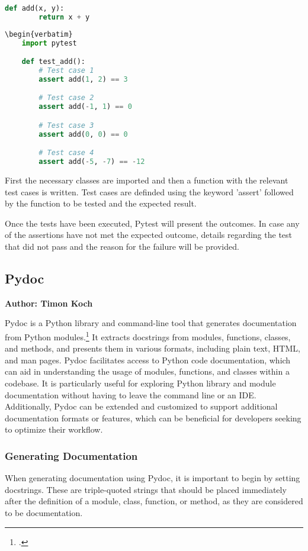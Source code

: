 \begin{minipage}
\begin{lstlisting}[language=Python] 
	def add(x, y):
    	return x + y
\end{lstlisting}

\begin{lstlisting}[language=Python]
\begin{verbatim} 
	import pytest

	def test_add():
    	# Test case 1
    	assert add(1, 2) == 3

    	# Test case 2
    	assert add(-1, 1) == 0

    	# Test case 3
    	assert add(0, 0) == 0

    	# Test case 4
    	assert add(-5, -7) == -12
\end{lstlisting}
\end{minipage}

First the necessary classes are imported and then a function with the relevant test cases is written. Test cases are definded using the keyword 'assert' followed by the function to be tested  and the expected result. 

Once the tests have been executed, Pytest will present the outcomes. In case any of the assertions have not met the expected outcome, details regarding the test that did not pass and the reason for the failure will be provided.


\subsection{Pydoc}
\textbf{Author: Timon Koch}

Pydoc is a Python library and command-line tool that generates documentation from Python modules.\footcite{pydoc_git} It extracts docstrings from modules, functions, classes, and methods, and presents them in various formats, including plain text, HTML, and man pages.  Pydoc facilitates access to Python code documentation, which can aid in understanding the usage of modules, functions, and classes within a codebase. It is particularly useful for exploring Python library and module documentation without having to leave the command line or an IDE. Additionally, Pydoc can be extended and customized to support additional documentation formats or features, which can be beneficial for developers seeking to optimize their workflow. 

\subsubsection{Generating Documentation}
When generating documentation using Pydoc, it is important to begin by setting docstrings. These are triple-quoted strings that should be placed immediately after the definition of a module, class, function, or method, as they are considered to be documentation.

